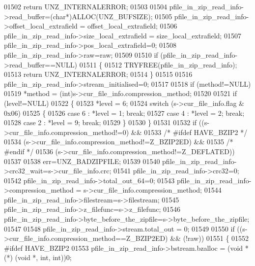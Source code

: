 \begin{DoxyCode}
01502         \textcolor{keywordflow}{return} UNZ\_INTERNALERROR;
01503 
01504     pfile\_in\_zip\_read\_info->read\_buffer=(\textcolor{keywordtype}{char}*)ALLOC(UNZ\_BUFSIZE);
01505     pfile\_in\_zip\_read\_info->offset\_local\_extrafield = offset\_local\_extrafield;
01506     pfile\_in\_zip\_read\_info->size\_local\_extrafield = size\_local\_extrafield;
01507     pfile\_in\_zip\_read\_info->pos\_local\_extrafield=0;
01508     pfile\_in\_zip\_read\_info->raw=raw;
01509 
01510     \textcolor{keywordflow}{if} (pfile\_in\_zip\_read\_info->read\_buffer==NULL)
01511     \{
01512         TRYFREE(pfile\_in\_zip\_read\_info);
01513         \textcolor{keywordflow}{return} UNZ\_INTERNALERROR;
01514     \}
01515 
01516     pfile\_in\_zip\_read\_info->stream\_initialised=0;
01517 
01518     \textcolor{keywordflow}{if} (method!=NULL)
01519         *method = (int)s->cur\_file\_info.compression\_method;
01520 
01521     if (level!=NULL)
01522     \{
01523         *level = 6;
01524         \textcolor{keywordflow}{switch} (s->cur\_file\_info.flag & 0x06)
01525         \{
01526           \textcolor{keywordflow}{case} 6 : *level = 1; \textcolor{keywordflow}{break};
01527           \textcolor{keywordflow}{case} 4 : *level = 2; \textcolor{keywordflow}{break};
01528           \textcolor{keywordflow}{case} 2 : *level = 9; \textcolor{keywordflow}{break};
01529         \}
01530     \}
01531 
01532     \textcolor{keywordflow}{if} ((s->cur\_file\_info.compression\_method!=0) &&
01533 \textcolor{comment}{/* #ifdef HAVE\_BZIP2 */}
01534         (s->cur\_file\_info.compression\_method!=Z\_BZIP2ED) &&
01535 \textcolor{comment}{/* #endif */}
01536         (s->cur\_file\_info.compression\_method!=Z\_DEFLATED))
01537 
01538         err=UNZ\_BADZIPFILE;
01539 
01540     pfile\_in\_zip\_read\_info->crc32\_wait=s->cur\_file\_info.crc;
01541     pfile\_in\_zip\_read\_info->crc32=0;
01542     pfile\_in\_zip\_read\_info->total\_out\_64=0;
01543     pfile\_in\_zip\_read\_info->compression\_method = s->cur\_file\_info.compression\_method;
01544     pfile\_in\_zip\_read\_info->filestream=s->filestream;
01545     pfile\_in\_zip\_read\_info->z\_filefunc=s->z\_filefunc;
01546     pfile\_in\_zip\_read\_info->byte\_before\_the\_zipfile=s->byte\_before\_the\_zipfile;
01547 
01548     pfile\_in\_zip\_read\_info->stream.total\_out = 0;
01549 
01550     \textcolor{keywordflow}{if} ((s->cur\_file\_info.compression\_method==Z\_BZIP2ED) && (!raw))
01551     \{
01552 \textcolor{preprocessor}{#ifdef HAVE\_BZIP2}
01553       pfile\_in\_zip\_read\_info->bstream.bzalloc = (\textcolor{keywordtype}{void} *(*) (\textcolor{keywordtype}{void} *, int, int))0;

\end{DoxyCode}
